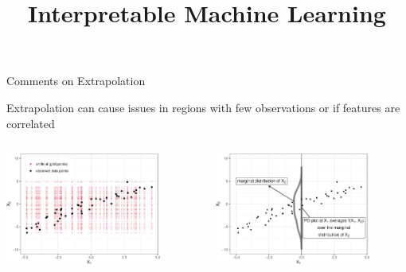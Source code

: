 \documentclass[11pt,compress,t,notes=noshow, aspectratio=169, xcolor=table]{beamer}
\title{Interpretable Machine Learning}
\date{}
\begin{document}
\newcommand{\titlefigure}{figure/pdp_bike}
\newcommand{\learninggoals}{
\item PD plots and relation to ICE plots
\item Interpretation of PDP
\item Extrapolation and Interactions in PDPs
\item Centered ICE and PDP
}


\begin{frame}{Comments on Extrapolation}


Extrapolation can cause issues in regions with few observations or if features are correlated
 
\begin{columns}[T]
\begin{column}{0.5\textwidth}
\centering
\includegraphics[width=0.8\textwidth]{figure/ale_scatter_grid}
\end{column}
\begin{column}{0.5\textwidth}
\centering
\includegraphics[width=0.8\textwidth]{figure/ale_pdplot}
\end{column}
\end{columns}


\end{frame}
\end{document}
